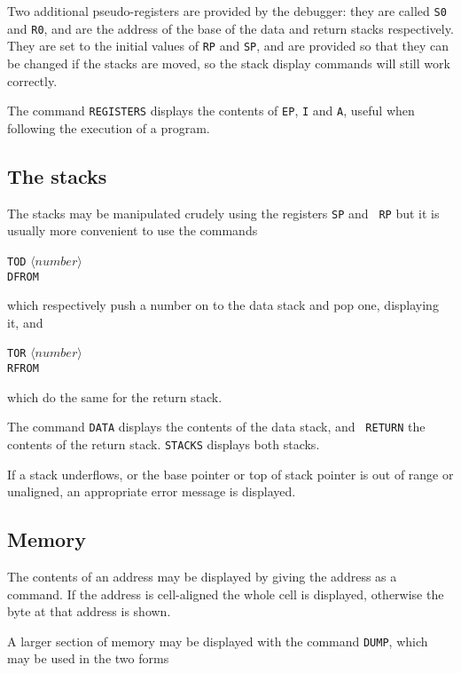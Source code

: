 \documentclass[english]{article}
\newcommand{\angb}[1]{$\langle #1\rangle$}
\begin{document}
Two additional pseudo-registers are provided by the debugger: they are
called {\tt S0} and {\tt R0}, and are the address of the base of the data and
return stacks respectively. They are set to the initial values of {\tt RP}
and {\tt SP}, and are provided so that they can be changed if the stacks are
moved, so the stack display commands will still work correctly.

The command {\tt REGISTERS} displays the contents of {\tt EP}, {\tt I} and
{\tt A}, useful when following the execution of a program.

\subsection{The stacks}

The stacks may be manipulated crudely using the registers {\tt SP} and {\tt
RP} but it is usually more convenient to use the commands

\begin{center}
{\tt TOD} \angb{number}\\
{\tt DFROM}
\end{center}

which respectively push a number on to the data stack and pop one, displaying
it, and

\begin{center}
{\tt TOR} \angb{number}\\
{\tt RFROM}
\end{center}

which do the same for the return stack.

The command {\tt DATA} displays the contents of the data stack, and {\tt
RETURN} the contents of the return stack. {\tt STACKS} displays both stacks.

If a stack underflows, or the base pointer or top of stack pointer is out of
range or unaligned, an appropriate error message is displayed.

\subsection{Memory}

The contents of an address may be displayed by giving the address as a
command. If the address is cell-aligned the whole cell is displayed,
otherwise the byte at that address is shown.

A larger section of memory may be displayed with the command {\tt DUMP},
which may be used in the two forms
\end{document}
